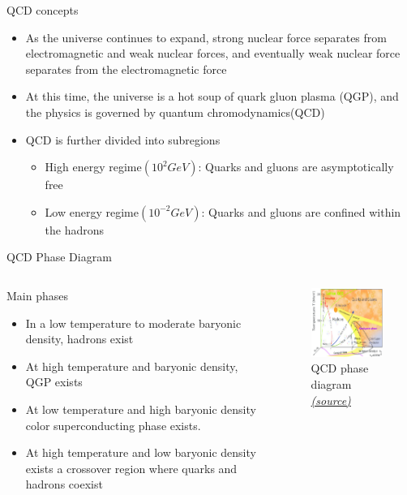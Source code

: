 \documentclass[12pt,aspectratio169]{beamer}
\begin{document}
\begin{frame}{QCD concepts}
    \begin{itemize}
        \item As the universe continues to expand, strong nuclear force separates from electromagnetic and weak nuclear forces, and eventually weak nuclear force separates from the electromagnetic force
        \item At this time, the universe is a hot soup of quark gluon plasma (QGP), and the physics is governed by quantum chromodynamics(QCD)
        \item QCD is further divided into subregions
        \begin{itemize}
            \item High energy regime$(10^2 GeV)$: Quarks and gluons are asymptotically free
            \item Low energy regime$(10^{-2}GeV)$: Quarks and gluons are confined within the hadrons
        \end{itemize}
 
    \end{itemize}
\end{frame}
\begin{frame}{QCD Phase Diagram}
\begin{columns}


    \begin{block}{Main phases}
        \begin{itemize}
            \item \footnotesize In a low temperature to moderate baryonic density, hadrons exist
            \item At high temperature and baryonic density, QGP exists
            \item At low temperature and high baryonic density color superconducting phase exists.
            \item At high temperature and low baryonic density exists a crossover region where quarks and hadrons coexist
        \end{itemize}
    \end{block}
    \begin{figure}
    \centering
    \includegraphics[width=5cm]{QCD-phase-diagram.png}
    \caption{QCD phase diagram \href{https://www.researchgate.net/figure/QCD-phase-diagram_fig5_302061982}{\textit{(source)}}}
    \end{figure}
\end{columns}    
\end{frame}
\end{document}
